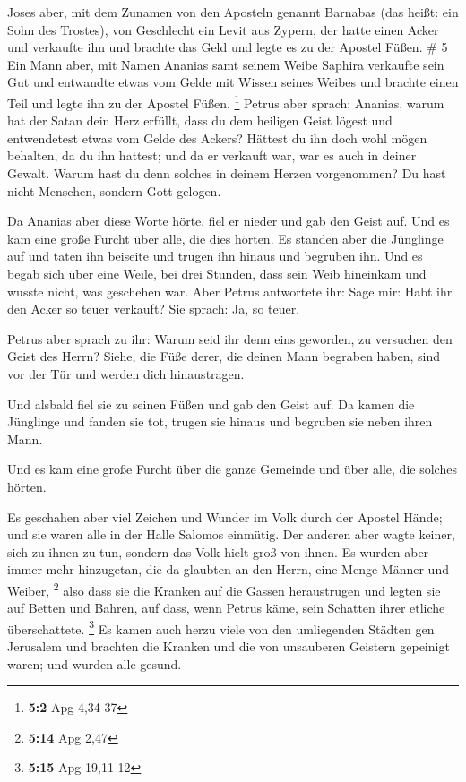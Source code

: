  Joses aber, mit dem Zunamen von den Aposteln genannt
Barnabas (das heißt: ein Sohn des Trostes), von Geschlecht ein Levit aus
Zypern,  der hatte einen Acker und verkaufte ihn und
brachte das Geld und legte es zu der Apostel Füßen. \# 5 
Ein Mann aber, mit Namen Ananias samt seinem Weibe Saphira verkaufte
sein Gut  und entwandte etwas vom Gelde mit Wissen seines
Weibes und brachte einen Teil und legte ihn zu der Apostel Füßen.
\footnote{\textbf{5:2} Apg 4,34-37}  Petrus aber sprach:
Ananias, warum hat der Satan dein Herz erfüllt, dass du dem heiligen
Geist lögest und entwendetest etwas vom Gelde des Ackers? 
Hättest du ihn doch wohl mögen behalten, da du ihn hattest; und da er
verkauft war, war es auch in deiner Gewalt. Warum hast du denn solches
in deinem Herzen vorgenommen? Du hast nicht Menschen, sondern Gott
gelogen.

 Da Ananias aber diese Worte hörte, fiel er nieder und gab
den Geist auf. Und es kam eine große Furcht über alle, die dies hörten.
 Es standen aber die Jünglinge auf und taten ihn beiseite
und trugen ihn hinaus und begruben ihn.  Und es begab sich
über eine Weile, bei drei Stunden, dass sein Weib hineinkam und wusste
nicht, was geschehen war.  Aber Petrus antwortete ihr: Sage
mir: Habt ihr den Acker so teuer verkauft? Sie sprach: Ja, so teuer.

 Petrus aber sprach zu ihr: Warum seid ihr denn eins
geworden, zu versuchen den Geist des Herrn? Siehe, die Füße derer, die
deinen Mann begraben haben, sind vor der Tür und werden dich
hinaustragen.

 Und alsbald fiel sie zu seinen Füßen und gab den Geist
auf. Da kamen die Jünglinge und fanden sie tot, trugen sie hinaus und
begruben sie neben ihren Mann.

 Und es kam eine große Furcht über die ganze Gemeinde und
über alle, die solches hörten.

 Es geschahen aber viel Zeichen und Wunder im Volk durch
der Apostel Hände; und sie waren alle in der Halle Salomos einmütig.
 Der anderen aber wagte keiner, sich zu ihnen zu tun,
sondern das Volk hielt groß von ihnen.  Es wurden aber
immer mehr hinzugetan, die da glaubten an den Herrn, eine Menge Männer
und Weiber, \footnote{\textbf{5:14} Apg 2,47}  also dass
sie die Kranken auf die Gassen heraustrugen und legten sie auf Betten
und Bahren, auf dass, wenn Petrus käme, sein Schatten ihrer etliche
überschattete. \footnote{\textbf{5:15} Apg 19,11-12}  Es
kamen auch herzu viele von den umliegenden Städten gen Jerusalem und
brachten die Kranken und die von unsauberen Geistern gepeinigt waren;
und wurden alle gesund.

